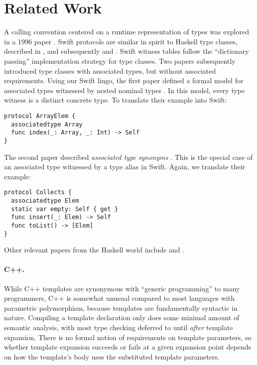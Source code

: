 \documentclass[../generics]{subfiles}
\begin{document}
\section{Related Work}

A calling convention centered on a runtime representation of types was explored in a 1996 paper \cite{intensional}. Swift protocols are similar in spirit to Haskell type classes, described in \cite{typeclass}, and subsequently \cite{typeclasshaskell} and \cite{peytonjones1997type}. Swift witness tables follow the ``dictionary passing'' implementation strategy for type classes. Two papers subsequently introduced type classes with associated types, but without associated requirements. Using our Swift lingo, the first paper defined a formal model for associated types witnessed by nested nominal types \cite{assoctype}. In this model, every type witness is a distinct concrete type. To translate their example into Swift:
\begin{Verbatim}
protocol ArrayElem {
  associatedtype Array
  func index(_: Array, _: Int) -> Self
}
\end{Verbatim}
The second paper described \emph{associated type synonyms} \cite{synonyms}. This is the special case of an associated type witnessed by a type alias in Swift. Again, we translate their example:
\begin{Verbatim}
protocol Collects {
  associatedtype Elem
  static var empty: Self { get }
  func insert(_: Elem) -> Self
  func toList() -> [Elem]
}
\end{Verbatim}
Other relevant papers  from the Haskell world include \cite{schrijvers2008type} and \cite{kiselyov2009fun}.

\paragraph{C++.} While C++ templates are synonymous with ``generic programming'' to many programmers, C++ is somewhat unusual compared to most languages with parametric polymorphism, because templates are fundamentally syntactic in nature. Compiling a template declaration only does some minimal amount of semantic analysis, with most type checking deferred to until \emph{after} template expansion. There is no formal notion of requirements on template parameters, so whether template expansion succeeds or fails at a given expansion point depends on how the template's body uses the substituted template parameters.
\end{document}
